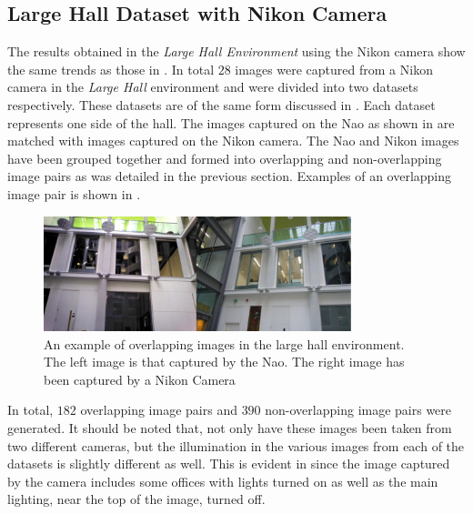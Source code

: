 \subsection{Large Hall Dataset with Nikon Camera}
\label{sec:nikonlargeHall}
The results obtained in the \textit{Large Hall Environment} using the Nikon camera show the same trends as those in . In total $28$ images were captured from a Nikon camera in the \textit{Large Hall} environment and were divided into two datasets respectively. These datasets are of the same form discussed in . Each dataset represents one side of the hall. The images captured on the Nao as shown in  are matched with images captured on the Nikon camera. The Nao and Nikon images have been grouped together and formed into overlapping and non-overlapping image pairs as was detailed in the previous section. Examples of an overlapping image pair is shown in .\\

\begin{figure}[h!] 
  \centering
    \includegraphics[width=0.8\textwidth]{../Drawings/camera/comparelargeHall.jpg}
    \caption{An example of overlapping images in the large hall environment. The left image is that captured by the Nao. The right image has been captured by a Nikon Camera}
    \label{fig:cameraOverlaplargeHall}
\end{figure}

In total, $182$ overlapping image pairs and $390$ non-overlapping image pairs were generated. It should be noted that, not only have these images been taken from two different cameras, but the illumination in the various images from each of the datasets is slightly different as well. This is evident in   since the image captured by the camera includes some offices with lights turned on as well as the main lighting, near the top of the image, turned off. \\


